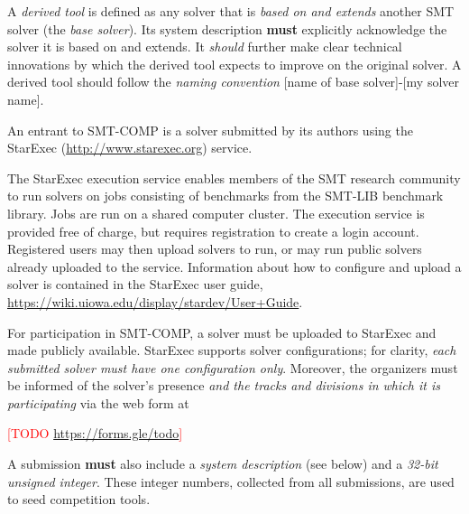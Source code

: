 \documentclass[12pt]{article}
\newcommand{\rem}[1]{\textcolor{red}{[#1]}}
\newcommand{\todo}[1]{\rem{TODO #1}}
\begin{document}
%
A \emph{derived tool} is defined as any solver that is \emph{based on and
extends} another SMT solver (the \emph{base solver}).  Its system description
\textbf{must} explicitly acknowledge
the solver it is based on and extends.  It \emph{should} further make clear
technical innovations by which the derived tool expects to improve on the
original solver.  A derived tool should follow the \emph{naming convention}
{[name of base solver]-[my solver name]}.

%
An entrant to SMT-COMP is a solver submitted by its authors using
the StarExec (\url{http://www.starexec.org}) service.

%
The StarExec execution
service enables members of the SMT research community to run solvers
on jobs consisting of benchmarks from the SMT-LIB benchmark library.
Jobs are run on a shared computer cluster.  The execution service is
provided free of charge, but requires registration to create a
login account.  Registered users may then upload solvers to
run, or may run public solvers already uploaded to the service.
Information about how to configure and upload a solver is contained in
the StarExec user guide,
\url{https://wiki.uiowa.edu/display/stardev/User+Guide}.

%
For participation in SMT-COMP, a solver must be uploaded to StarExec
and made publicly available.  StarExec supports solver configurations;
for clarity, \emph{each submitted solver must have one configuration
  only}.  Moreover, the organizers must be informed of the solver's
presence \emph{and the tracks and divisions in which it is
  participating} via the web form at
\begin{center}
  \todo{\url{https://forms.gle/todo}}
\end{center}
A submission \textbf{must} also include a \emph{system description} (see below)
and a \emph{32-bit unsigned integer}.
 These integer numbers, collected from all submissions, are used to seed
 competition tools.
\end{document}
